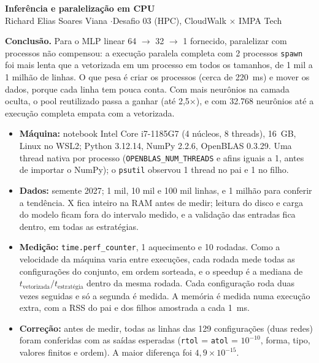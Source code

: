 \documentclass[10pt,a4paper]{article}
\makeatletter
\renewcommand\section{\@startsection{section}{1}{\z@}{-1.6ex plus -0.4ex}{0.5ex}{\normalfont\large\bfseries}}
\newcommand{\x}{\ensuremath{\times}}
\makeatother
\begin{document}
{\LARGE\bfseries Inferência e paralelização em CPU}\\[3pt]
Richard Elias Soares Viana \quad$\cdot$\quad Desafio 03 (HPC), CloudWalk \x{} IMPA Tech

\textbf{Conclusão.} Para o MLP linear 64 $\to$ 32 $\to$ 1 fornecido, paralelizar com
processos não compensou: a execução paralela completa com 2 processos \texttt{spawn} foi mais
lenta que a vetorizada em um processo em todos os tamanhos, de 1 mil a 1 milhão de linhas.
O que pesa é criar os processos (cerca de 220~ms) e mover os dados, porque cada linha tem
pouca conta. Com mais neurônios na camada oculta, o pool reutilizado passa a ganhar (até
2,5\x), e com 32.768 neurônios até a execução completa empata com a vetorizada.

\section{Ambiente e protocolo}

\begin{itemize}
\item \textbf{Máquina:} notebook Intel Core i7-1185G7 (4 núcleos, 8 threads), 16~GB, Linux
  no WSL2; Python 3.12.14, NumPy 2.2.6, OpenBLAS 0.3.29. Uma thread nativa por processo
  (\texttt{OPENBLAS\_NUM\_THREADS} e afins iguais a 1, antes de importar o NumPy); o
  \texttt{psutil} observou 1 thread no pai e 1 no filho.
\item \textbf{Dados:} semente 2027; 1 mil, 10 mil e 100 mil linhas, e 1 milhão para conferir
  a tendência. X fica inteiro na RAM antes de medir; leitura do disco e carga do modelo ficam
  fora do intervalo medido, e a validação das entradas fica dentro, em todas as estratégias.
\item \textbf{Medição:} \texttt{time.perf\_counter}, 1 aquecimento e 10 rodadas. Como a
  velocidade da máquina varia entre execuções, cada rodada mede todas as configurações do
  conjunto, em ordem sorteada, e o speedup é a mediana de
  $t_{\text{vetorizada}}/t_{\text{estratégia}}$ dentro da mesma rodada. Cada configuração roda
  duas vezes seguidas e só a segunda é medida. A memória é medida numa execução extra, com a
  RSS do pai e dos filhos amostrada a cada 1~ms.
\item \textbf{Correção:} antes de medir, todas as linhas das 129 configurações (duas redes)
  foram conferidas com as saídas esperadas (\texttt{rtol} = \texttt{atol} = $10^{-10}$,
  forma, tipo, valores finitos e ordem). A maior diferença foi $4{,}9\times10^{-15}$.
\end{itemize}
\end{document}
